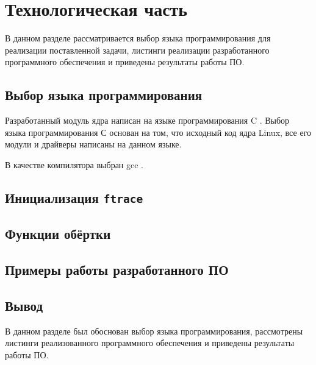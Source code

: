 \chapter{Технологическая часть}

В данном разделе рассматривается выбор языка программирования для реализации поставленной задачи, листинги реализации разработанного программного обеспечения и приведены результаты работы ПО.

\section{Выбор языка программирования}

Разработанный модуль ядра написан на языке программирования C \cite{c-language}. Выбор языка программирования С основан на том, что исходный код ядра Linux, все его модули и драйверы написаны на данном языке.

В качестве компилятора выбран gcc \cite{gcc}.

\section{Инициализация \texttt{ftrace}}

\section{Функции обёртки}

\section{Примеры работы разработанного ПО}

\section*{Вывод}

В данном разделе был обоснован выбор языка программирования, рассмотрены листинги реализованного программного обеспечения и приведены результаты работы ПО.